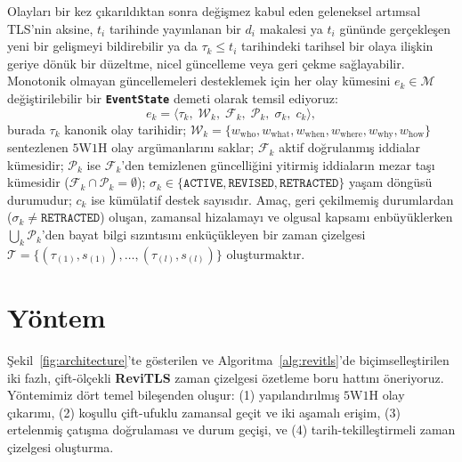 ﻿\documentclass[journal]{IEEEtran}
\begin{document}
Olaylar{\i} bir kez \c{c}{\i}kar{\i}ld{\i}ktan sonra de\u{g}i\c{s}mez kabul eden geleneksel art{\i}msal TLS'nin aksine, $t_i$ tarihinde yay{\i}nlanan bir $d_i$ makalesi ya $t_i$ g\"{u}n\"{u}nde ger\c{c}ekle\c{s}en yeni bir geli\c{s}meyi bildirebilir ya da $\tau_k \le t_i$ tarihindeki tarihsel bir olaya ili\c{s}kin geriye d\"{o}n\"{u}k bir d\"{u}zeltme, nicel g\"{u}ncelleme veya geri \c{c}ekme sa\u{g}layabilir. Monotonik olmayan g\"{u}ncellemeleri desteklemek i\c{c}in her olay k\"{u}mesini $e_k \in \mathcal{M}$ de\u{g}i\c{s}tirilebilir bir \textbf{\texttt{EventState}} demeti olarak temsil ediyoruz:
\begin{equation}
e_k = \langle \tau_k,\; \mathcal{W}_k,\; \mathcal{F}_k,\; \mathcal{P}_k,\; \sigma_k,\; c_k \rangle,
\label{eq:event_state}
\end{equation}
burada $\tau_k$ kanonik olay tarihidir; $\mathcal{W}_k = \{w_{\text{who}}, w_{\text{what}}, w_{\text{when}}, w_{\text{where}}, w_{\text{why}}, w_{\text{how}}\}$ sentezlenen $5\text{W}1\text{H}$ olay arg\"{u}manlar{\i}n{\i} saklar; $\mathcal{F}_k$ aktif do\u{g}rulanm{\i}\c{s} iddialar k\"{u}mesidir; $\mathcal{P}_k$ ise $\mathcal{F}_k$'den temizlenen g\"{u}ncelli\u{g}ini yitirmi\c{s} iddialar{\i}n mezar ta\c{s}{\i} k\"{u}mesidir ($\mathcal{F}_k \cap \mathcal{P}_k = \emptyset$); $\sigma_k \in \{\texttt{ACTIVE}, \texttt{REVISED}, \texttt{RETRACTED}\}$ ya\c{s}am d\"{o}ng\"{u}s\"{u} durumudur; $c_k$ ise k\"{u}m\"{u}latif destek say{\i}s{\i}d{\i}r. Ama\c{c}, geri \c{c}ekilmemi\c{s} durumlardan ($\sigma_k \neq \texttt{RETRACTED}$) olu\c{s}an, zamansal hizalamay{\i} ve olgusal kapsam{\i} enb\"{u}y\"{u}klerken $\bigcup_k \mathcal{P}_k$'den bayat bilgi s{\i}z{\i}nt{\i}s{\i}n{\i} enk\"{u}\c{c}\"{u}kleyen bir zaman \c{c}izelgesi $\mathcal{T} = \{(\tau_{(1)}, s_{(1)}), \dots, (\tau_{(l)}, s_{(l)})\}$ olu\c{s}turmakt{\i}r.

\section{Y\"{o}ntem}
\label{sec:methodology}

\c{S}ekil~\ref{fig:architecture}'te g\"{o}sterilen ve Algoritma~\ref{alg:revitls}'de bi\c{c}imselle\c{s}tirilen iki fazl{\i}, \c{c}ift-\"{o}l\c{c}ekli \textbf{ReviTLS} zaman \c{c}izelgesi \"{o}zetleme boru hatt{\i}n{\i} \"{o}neriyoruz. Y\"{o}ntemimiz d\"{o}rt temel bile\c{s}enden olu\c{s}ur: (1) yap{\i}land{\i}r{\i}lm{\i}\c{s} $5\text{W}1\text{H}$ olay \c{c}{\i}kar{\i}m{\i}, (2) ko\c{s}ullu \c{c}ift-ufuklu zamansal ge\c{c}it ve iki a\c{s}amal{\i} eri\c{s}im, (3) ertelenmi\c{s} \c{c}at{\i}\c{s}ma do\u{g}rulamas{\i} ve durum ge\c{c}i\c{s}i, ve (4) tarih-tekille\c{s}tirmeli zaman \c{c}izelgesi olu\c{s}turma.
\end{document}
